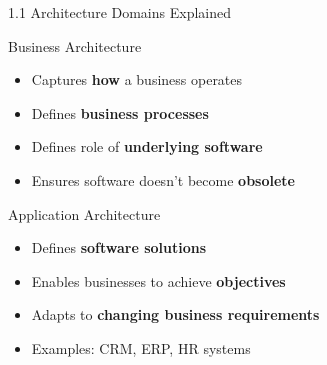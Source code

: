 \documentclass{beamer}
\begin{document}
	\begin{frame}{1.1 Architecture Domains Explained}
		\begin{block}{Business Architecture}
			\begin{itemize}
				\item Captures \textbf{how} a business operates
				\item Defines \textbf{business processes}
				\item Defines role of \textbf{underlying software}
				\item Ensures software doesn't become \textbf{obsolete}
			\end{itemize}
		\end{block}
		
		\begin{block}{Application Architecture}
			\begin{itemize}
				\item Defines \textbf{software solutions}
				\item Enables businesses to achieve \textbf{objectives}
				\item Adapts to \textbf{changing business requirements}
				\item Examples: CRM, ERP, HR systems
			\end{itemize}
		\end{block}
	\end{frame}
	
\end{document}
